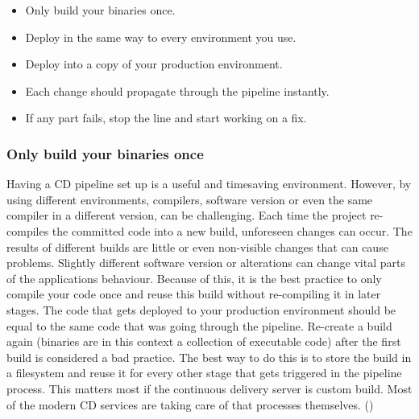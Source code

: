 \begin{itemize}
  \item Only build your binaries once.
  \item Deploy in the same way to every environment you use.
  \item Deploy into a copy of your production environment.
  \item Each change should propagate through the pipeline instantly.
  \item If any part fails, stop the line and start working on a fix.
\end{itemize} \cite{humble2010continuous}

\subsubsection{Only build your binaries once}
Having a CD pipeline set up is a useful and timesaving environment. However, by using different environments, compilers, software version or even the same
compiler in a different version, can be challenging. Each time the project re-compiles the committed code into a new build, unforeseen changes can occur.
The results of different builds are little or even non-visible changes that can cause problems. Slightly different software version or alterations can change
vital parts of the applications behaviour. Because of this, it is the best practice to only compile your
code once and reuse this build without re-compiling it in later stages. The code that gets deployed to your production environment should be equal to the same
code that was going through the pipeline. Re-create a build again (binaries are in this context a collection of executable code) after the first
build is considered a bad practice. The best way to do this is to store the build in a filesystem and reuse it for every other stage that gets triggered in the
pipeline process. This matters most if the continuous delivery server is custom build. Most of the modern CD services are taking care of that processes
themselves. (\cite{humble2010continuous})

